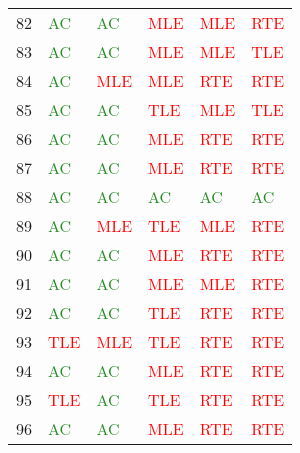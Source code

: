 \documentclass[thesis=M,english,hidelinks]{FITthesis}[2012/10/20]
\theoremstyle{definition}
\begin{document}
\begin{table}[ht]
\begin{tabular}{ m{1cm} | m{1.5cm} m{1.5cm} m{1.5cm} m{1.5cm} m{1.5cm} }
        82 & \textcolor{ForestGreen}{AC} & \textcolor{ForestGreen}{AC} & \textcolor{Red}{MLE} & \textcolor{Red}{MLE} & \textcolor{Red}{RTE} \\
        83 & \textcolor{ForestGreen}{AC} & \textcolor{ForestGreen}{AC} & \textcolor{Red}{MLE} & \textcolor{Red}{MLE} & \textcolor{Red}{TLE} \\
        84 & \textcolor{ForestGreen}{AC} & \textcolor{Red}{MLE} & \textcolor{Red}{MLE} & \textcolor{Red}{RTE} & \textcolor{Red}{RTE} \\
        85 & \textcolor{ForestGreen}{AC} & \textcolor{ForestGreen}{AC} & \textcolor{Red}{TLE} & \textcolor{Red}{MLE} & \textcolor{Red}{TLE} \\
        86 & \textcolor{ForestGreen}{AC} & \textcolor{ForestGreen}{AC} & \textcolor{Red}{MLE} & \textcolor{Red}{RTE} & \textcolor{Red}{RTE} \\
        87 & \textcolor{ForestGreen}{AC} & \textcolor{ForestGreen}{AC} & \textcolor{Red}{MLE} & \textcolor{Red}{RTE} & \textcolor{Red}{RTE} \\
        88 & \textcolor{ForestGreen}{AC} & \textcolor{ForestGreen}{AC} & \textcolor{ForestGreen}{AC} & \textcolor{ForestGreen}{AC} & \textcolor{ForestGreen}{AC} \\
        89 & \textcolor{ForestGreen}{AC} & \textcolor{Red}{MLE} & \textcolor{Red}{TLE} & \textcolor{Red}{MLE} & \textcolor{Red}{RTE} \\
        90 & \textcolor{ForestGreen}{AC} & \textcolor{ForestGreen}{AC} & \textcolor{Red}{MLE} & \textcolor{Red}{RTE} & \textcolor{Red}{RTE} \\
        91 & \textcolor{ForestGreen}{AC} & \textcolor{ForestGreen}{AC} & \textcolor{Red}{MLE} & \textcolor{Red}{MLE} & \textcolor{Red}{RTE} \\
        92 & \textcolor{ForestGreen}{AC} & \textcolor{ForestGreen}{AC} & \textcolor{Red}{TLE} & \textcolor{Red}{RTE} & \textcolor{Red}{RTE} \\
        93 & \textcolor{Red}{TLE} & \textcolor{Red}{MLE} & \textcolor{Red}{TLE} & \textcolor{Red}{RTE} & \textcolor{Red}{RTE} \\
        94 & \textcolor{ForestGreen}{AC} & \textcolor{ForestGreen}{AC} & \textcolor{Red}{MLE} & \textcolor{Red}{RTE} & \textcolor{Red}{RTE} \\
        95 & \textcolor{Red}{TLE} & \textcolor{ForestGreen}{AC} & \textcolor{Red}{TLE} & \textcolor{Red}{RTE} & \textcolor{Red}{RTE} \\
        96 & \textcolor{ForestGreen}{AC} & \textcolor{ForestGreen}{AC} & \textcolor{Red}{MLE} & \textcolor{Red}{RTE} & \textcolor{Red}{RTE} \\

\end{tabular}
\end{table}
\end{document}
